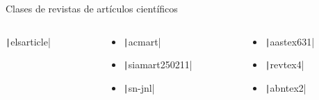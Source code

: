 \begin{frame}
\begin{block}{Clases de revistas de artículos científicos}
\begin{columns}
\begin{column}{.3\paperwidth}
\begin{itemize}
					      \texttt|elsarticle|
				\end{itemize}
			\end{column}
			\begin{column}{.3\paperwidth}
				\begin{itemize}
					\item

					      \texttt|acmart|

					\item

					      \texttt|siamart250211|

					\item

					      \texttt|sn-jnl|
				\end{itemize}
			\end{column}
			\begin{column}{.3\paperwidth}
				\begin{itemize}
					\item

					      \texttt|aastex631|

					\item

					      \texttt|revtex4|

					\item

					      \texttt|abntex2|
				\end{itemize}
			\end{column}
		\end{columns}
	\end{block}


\end{frame}
